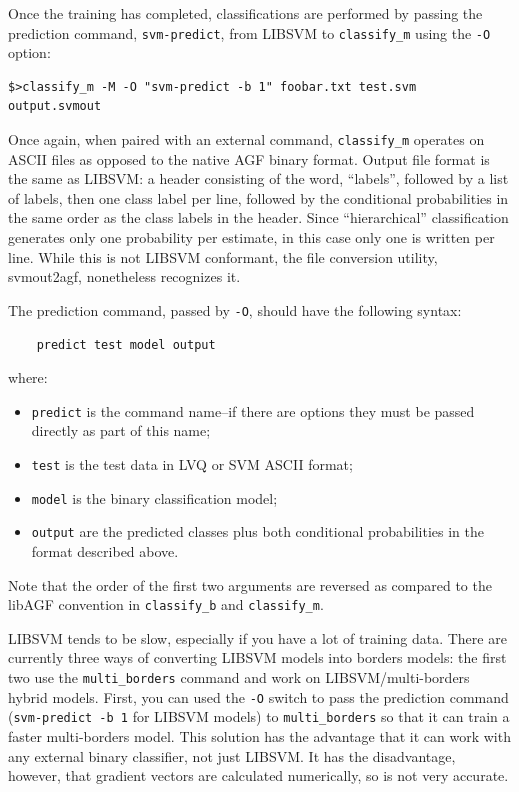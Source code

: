 \documentclass[12pt]{article}
\begin{document}
Once the training has completed, classifications are performed by passing the prediction command, \verb"svm-predict", from LIBSVM to \verb"classify_m" using the \verb/-O/ option:
\begin{verbatim}
$>classify_m -M -O "svm-predict -b 1" foobar.txt test.svm output.svmout
\end{verbatim}

Once again, when paired with an external command, \verb/classify_m/ operates on ASCII files as opposed to the native AGF binary format. Output file format is the same as LIBSVM: a header consisting of the word, ``labels'', followed by a list of labels, then one class label per line, followed by the conditional probabilities in the same order as the class labels in the header. Since ``hierarchical'' classification generates only one probability per estimate, in this case only one is written per line.  While this is not LIBSVM conformant, the file conversion utility, svmout2agf, nonetheless recognizes it.  

The prediction command, passed by \verb"-O", should have the following syntax:
\begin{verbatim}
    predict test model output
\end{verbatim}
where:
\begin{itemize}
\item \verb$predict$ is the command name--if there are options they must be passed directly as part of this name;
\item \verb$test$ is the test data in LVQ or SVM ASCII format;
\item \verb$model$ is the binary classification model;
\item \verb$output$ are the predicted classes plus both conditional probabilities in the format described above.
\end{itemize}
Note that the order of the first two arguments are reversed as compared to the libAGF convention in \verb/classify_b/ and \verb/classify_m/.

LIBSVM tends to be slow, especially if you have a lot of training data.  
There are currently three ways of converting LIBSVM models into borders
models: the first two use the \verb/multi_borders/ command and work on
LIBSVM/multi-borders hybrid models.
First, you can used the \verb/-O/ switch to pass the prediction command 
(\verb/svm-predict -b 1/ for LIBSVM models) to
\verb/multi_borders/ so that it can train a faster multi-borders model.
This solution has the advantage that it can work with any external binary
classifier, not just LIBSVM.
It has the disadvantage, however, that gradient vectors are calculated
numerically, so is not very accurate.
\end{document}
